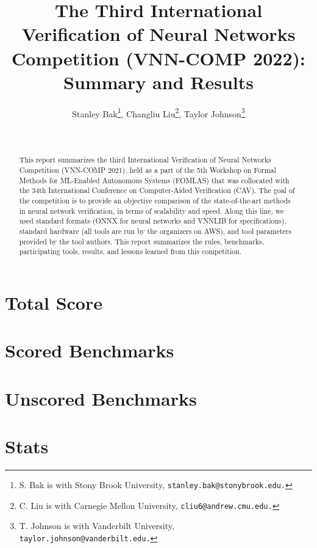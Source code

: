 \documentclass{easychair}
\title{The Third International Verification of Neural Networks Competition (VNN-COMP 2022): Summary and Results%
}
\author{Stanley Bak\thanks{S. Bak is with Stony Brook University, \tt stanley.bak@stonybrook.edu.}, Changliu Liu\thanks{C. Liu is with Carnegie Mellon University, \tt cliu6@andrew.cmu.edu.}, Taylor Johnson\thanks{T. Johnson is with Vanderbilt University, \tt taylor.johnson@vanderbilt.edu.}
}
\institute{
 }
\date{\phantom{date}\\}
\begin{document}
\maketitle

\begin{abstract}
This report summarizes the third International Verification of Neural Networks Competition (VNN-COMP 2021), held as a part of the 5th Workshop on Formal Methods for ML-Enabled Autonomous Systems (FOMLAS) that was collocated with the 34th International Conference on Computer-Aided Verification (CAV).
%
%
The goal of the competition is to provide an objective comparison of the state-of-the-art methods in neural network verification, in terms of scalability and speed.
%
Along this line, we used standard formats (ONNX for neural networks and VNNLIB for specifications), standard hardware (all tools are run by the organizers on AWS), and tool parameters provided by the tool authors.
%
This report summarizes the rules, benchmarks, participating tools, results, and lessons learned from this competition.
\end{abstract}



%
\section{Total Score}


\clearpage
\section{Scored Benchmarks}


\clearpage
\section{Unscored Benchmarks}


\clearpage
\section{Stats}


%

%

%

%

%
\end{document}

